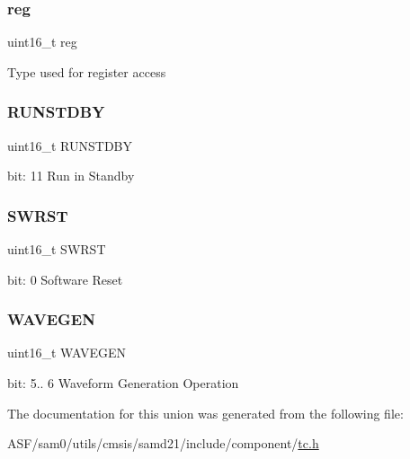 \subsubsection{\texorpdfstring{reg}{reg}}
{\footnotesize\ttfamily uint16\+\_\+t reg}

Type used for register access \mbox{\label{union_t_c___c_t_r_l_a___type_a0a98954fc108f309f3232355e809617b}} 
\subsubsection{\texorpdfstring{RUNSTDBY}{RUNSTDBY}}
{\footnotesize\ttfamily uint16\+\_\+t R\+U\+N\+S\+T\+D\+BY}

bit\+: 11 Run in Standby \mbox{\label{union_t_c___c_t_r_l_a___type_a4987fcca11694bd2ffae6a773a9bfc24}} 
\subsubsection{\texorpdfstring{SWRST}{SWRST}}
{\footnotesize\ttfamily uint16\+\_\+t S\+W\+R\+ST}

bit\+: 0 Software Reset \mbox{\label{union_t_c___c_t_r_l_a___type_a62254048bc54afeeeb336dd4d6b581ed}} 
\subsubsection{\texorpdfstring{WAVEGEN}{WAVEGEN}}
{\footnotesize\ttfamily uint16\+\_\+t W\+A\+V\+E\+G\+EN}

bit\+: 5.. 6 Waveform Generation Operation 

The documentation for this union was generated from the following file\+:\begin{DoxyCompactItemize}
\item 
A\+S\+F/sam0/utils/cmsis/samd21/include/component/\mbox{\hyperlink{utils_2cmsis_2samd21_2include_2component_2tc_8h}{tc.\+h}}\end{DoxyCompactItemize}

